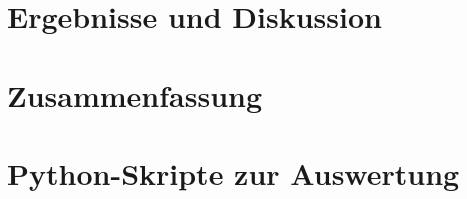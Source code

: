 \documentclass[11pt,a4paper,oneside]{scrartcl}
\begin{document}
\section{Ergebnisse und Diskussion}
\section{Zusammenfassung}
\newpage

 

\appendix

\section{Python-Skripte zur Auswertung}
\end{document}
